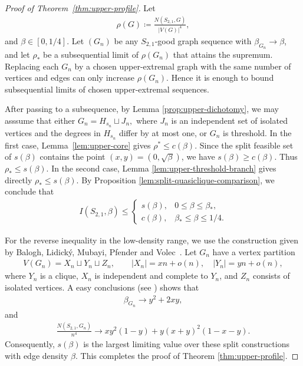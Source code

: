 \documentclass[10pt,a4paper]{article}
\begin{document}
\begin{proof}[Proof of Theorem~\ref{thm:upper-profile}]




Let 
\begin{align*}
  \rho(G)\coloneqq\frac{N(S_{2,1},G)}{|V(G)|^4},
\end{align*}
and $\beta\in [0, 1/4]$.  Let $(G_n)$ be any $S_{2,1}$-good graph sequence
with $\beta_{G_n}\to\beta$, and let $\rho_*$ be a  subsequential limit of
$\rho(G_n)$ that attains the supremum.  Replacing each $G_n$ by a chosen upper-extremal graph with the
same number of vertices and edges can only increase $\rho(G_n)$.  Hence it is
enough to bound subsequential limits of chosen upper-extremal sequences.

After passing to a subsequence, by Lemma \ref{prop:upper-dichotomy}, we may asssume that either 
$G_n=H_{s_n}\sqcup J_n,$ where $J_n$ is an independent set of isolated vertices and the degrees in
$H_{s_n}$ differ by at most one, or $G_n$ is threshold.  In the first case, Lemma~\ref{lem:upper-core} gives $\rho^*\le c(\beta)$.
Since the split feasible set of $s(\beta)$ contains the point \((x,y)=(0,\sqrt{\beta})\), we have $s(\beta)\ge c(\beta).$
Thus \(\rho_*\le s(\beta)\).  In the second case, Lemma
\ref{lem:upper-threshold-branch} gives directly
$
  \rho_*\le s(\beta).
$
By Proposition \ref{lem:split-quasiclique-comparison}, we conclude that  
\begin{align*}
  I(S_{2,1},\beta)\le  
  \begin{cases}
    s(\beta), & 0\le\beta\le\beta_*,\\
    c(\beta), & \beta_*\le\beta\le1/4.
  \end{cases}
\end{align*}



For the reverse inequality in the low-density range, we use the construction given by Balogh, Lidick\'y, Mubayi, Pfender and Volec~\cite{BLMPV}. Let $G_n$ have a vertex partition
\begin{align*}
  V(G_n)=X_n\sqcup Y_n\sqcup Z_n,
  \qquad |X_n|=xn+o(n),\quad |Y_n|=yn+o(n),
\end{align*}
where $Y_n$ is a clique, $X_n$ is independent and complete to $Y_n$, and
$Z_n$ consists of isolated vertices.  A easy conclusions (see \cite{BLMPV}) shows that 
\begin{align*}%
  \beta_{G_n}\to y^2+2xy,
\end{align*}
and
\begin{align*}%
  \frac{N(S_{2,1},G_n)}{n^4}
  \to xy^2(1-y)+y(x+y)^2(1-x-y).
\end{align*}
Consequently, $s(\beta)$ is the largest limiting value over these split
constructions with edge density $\beta$.
This completes the proof of Theorem \ref{thm:upper-profile}. \end{proof}
\end{document}
